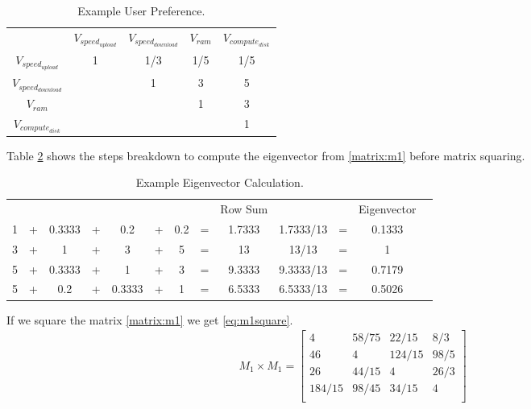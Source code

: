\begin{table}
\begin{center}
\caption{Example User Preference.}
\label{table:weight_example}
\begin{tabular}{@{}c@{}c@{}c@{}c@{}c@{}}
& $V_{speed_{upload}}$ & $V_{speed_{download}}$ & $V_{ram}$ & $V_{compute_{disk}}$ \\
$V_{speed_{upload}}$ & 1 & 1/3 & 1/5 & 1/5 \\
$V_{speed_{download}}$ & & 1 & 3 & 5 \\
$V_{ram}$ & & & 1 & 3 \\
$V_{compute_{disk}}$ & & & & 1 \\
\end{tabular}
\end{center}
\end{table}

Table \ref{table:example_eigenvector} shows the steps breakdown to compute the eigenvector from \eqref{matrix:m1} before matrix squaring.

\begin{table}[ht]
\begin{center}
\caption{Example Eigenvector Calculation.}
\label{table:example_eigenvector}
\begin{tabular}{ccccccccccccc}
  &   &        &   &        &   &     &    & Row Sum &           & & Eigenvector\\
1 & + & 0.3333 & + & 0.2    & + & 0.2 & =  & 1.7333  & 1.7333/13 &=& 0.1333 \\
3 & + & 1      & + & 3      & + & 5   & =  & 13      & 13/13     &=& 1\\
5 & + & 0.3333 & + & 1      & + & 3   & =  & 9.3333  & 9.3333/13 &=& 0.7179\\
5 & + & 0.2    & + & 0.3333 & + & 1   & =  & 6.5333  & 6.5333/13 &=& 0.5026\\
\end{tabular}
\end{center}
\end{table}

If we square the matrix \eqref{matrix:m1} we get \eqref{eq:m1square}.
\begin{equation}
\label{eq:m1square}
\begin{array}{c}
    M_1 \times M_1 =
    \begin{bmatrix}
        4      & 58/75 & 22/15  & 8/3 \\
        46     & 4     & 124/15 & 98/5 \\
        26     & 44/15 & 4      & 26/3 \\
        184/15 & 98/45 & 34/15  & 4\\
    \end{bmatrix}\\
\end{array}
\end{equation}

